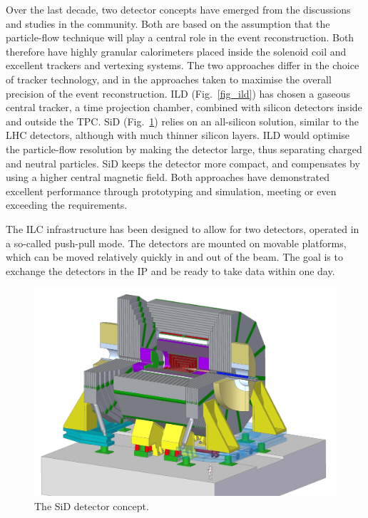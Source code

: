 \documentclass[%
 reprint,
 amsmath,amssymb,
 aps,
]{revtex4-1}
\def\Fig#1{Fig.~\ref{#1}}
\begin{document}
Over the last decade, two detector concepts have emerged from the
discussions and studies in the community. Both are based on the assumption that
the 
particle-flow technique will  play a central role in the event
reconstruction. Both therefore have highly granular calorimeters
placed inside the solenoid coil
and excellent trackers and vertexing systems. The two approaches
differ in the choice of tracker technology, and in the approaches taken
to maximise the overall precision of the event reconstruction. ILD
(\Fig{fig_ild}) has chosen a gaseous central tracker, a time
projection chamber, combined with silicon detectors inside and outside
the TPC. SiD (\Fig{fig_sid}) relies on an all-silicon solution,
similar to the
 LHC detectors, although with
much thinner silicon layers. ILD would optimise the particle-flow
resolution by making the detector large, thus separating charged and
neutral particles. SiD keeps the detector more compact, and
compensates by using a higher central magnetic field. Both approaches
have demonstrated excellent performance through prototyping
 and simulation, meeting or even exceeding the requirements. 

The ILC infrastructure has been designed to allow for two detectors,
operated in a so-called push-pull mode. The detectors are mounted on
movable platforms, which can be moved relatively quickly in and out of
the beam. The goal is to exchange the detectors in the IP and be ready
to take data within 
one day. 

\begin{figure}[tb]
 \begin{center}
 \includegraphics[width=\hsize]{figures/SiD.jpg}
\caption{The SiD detector concept.
\label{fig_sid}}
 \end{center}
 \vspace{-0.7cm}
 \end{figure}
\end{document}
